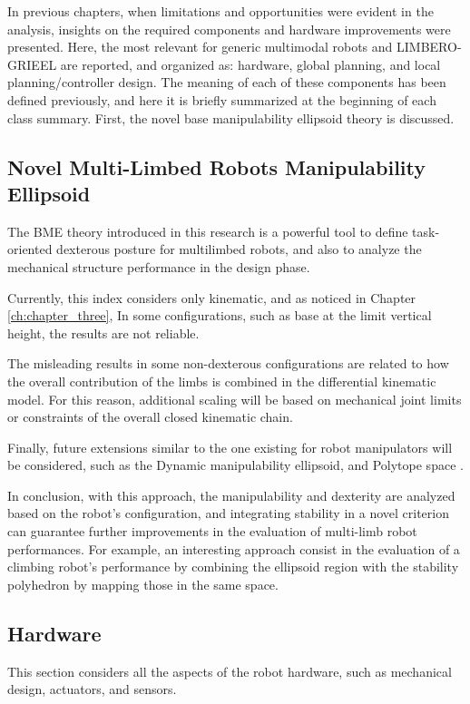 In previous chapters, when limitations and opportunities were evident in the analysis, insights on the required components and hardware improvements were presented. 
Here, the most relevant for generic multimodal robots and LIMBERO-GRIEEL are reported, and organized as: hardware, global planning, and local planning/controller design. The meaning of each of these components has been defined previously, and here it is briefly summarized at the beginning of each class summary. First, the novel base manipulability ellipsoid theory is discussed.  

\subsection{Novel Multi-Limbed Robots Manipulability Ellipsoid}
\label{sec:BME_future}
The BME theory introduced in this research is a powerful tool to define task-oriented dexterous posture for multilimbed robots, and also to analyze the mechanical structure performance in the design phase.

Currently, this index considers only kinematic, and as noticed in Chapter \ref{ch:chapter_three}, In some configurations, such as base at the limit vertical height, the results are not reliable. 

The misleading results in some non-dexterous configurations are related to how the overall contribution of the limbs is combined in the differential kinematic model. 
For this reason, additional scaling will be based on mechanical joint limits or constraints of the overall closed kinematic chain.   

Finally, future extensions similar to the one existing for robot manipulators will be considered, such as the Dynamic manipulability ellipsoid\cite{AsadaDynamicManipulability}\cite{Siciliano}, and Polytope space \cite{PolytopesManipulability}\cite{velocityWorkspacePolytope}. 

In conclusion, with this approach, the manipulability and dexterity are analyzed based on the robot's configuration, and integrating stability in a novel criterion can guarantee further improvements in the evaluation of multi-limb robot performances. 
For example, an interesting approach consist in the evaluation of a climbing robot's performance by combining the ellipsoid region with the stability polyhedron\cite{GIA_polyedron} by mapping those in the same space.


\subsection{Hardware}
\label{sec:Hardware}
This section considers all the aspects of the robot hardware, such as mechanical design, actuators, and sensors.

